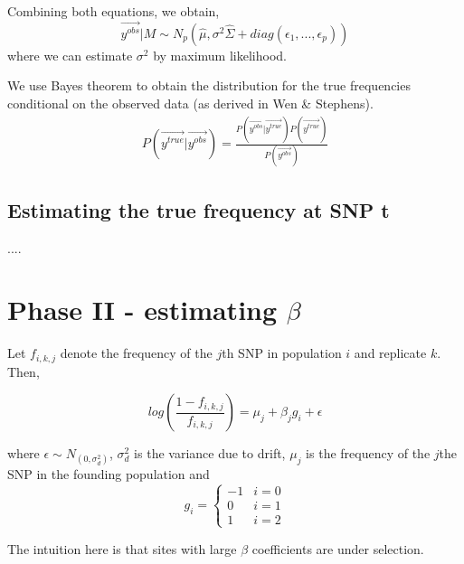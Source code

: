 \documentclass[10pt,a4paper,draft]{article}
\begin{document}
Combining both equations, we obtain,
\begin{equation}
 \vec{y^{obs}}|M \sim N_p(\hat{\mu}, \sigma^2\hat{\Sigma} + diag(\epsilon_1,...,\epsilon_p))
\end{equation}
where we can estimate $\sigma^2$ by maximum likelihood.

We use Bayes theorem to obtain the distribution for the true frequencies conditional on the observed data (as derived in Wen \& Stephens).
\begin{align*}
P(\vec{y^{true}} | \vec{y^{obs}}) = \frac{P(\vec{y^{obs}} | \vec{y^{true}}) P(\vec{y^{true}})}{P(\vec{y^{obs}})} 
\end{align*}

\iffalse
\begin{equation}
\sim N_p\Big((\frac{\hat{\Sigma}^{-1}}{\sigma^2} + \frac{I}{\epsilon^2})^{-1}(\frac{\hat{\Sigma}^{-1}\hat{\mu}}{\sigma^2} + \frac{\vec{y^{obs}}}{\epsilon^2}), (\frac{\hat{\Sigma}^{-1}}{\sigma^2} + \frac{I}{\epsilon^2})^{-1}\Big)\label{likl}
\end{equation}
\fi
\subsection{Estimating the true frequency at SNP t}
....

\section{Phase II - estimating $\beta$}
Let $f_{i,k,j}$ denote the frequency of the $j$th SNP in population $i$ and replicate $k$. Then,

\begin{equation}
log(\frac{1-f_{i,k,j}}{f_{i,k,j}}) = \mu_j + \beta_{j} g_i + \epsilon
\end{equation}

where $\epsilon \sim N_(0, \sigma_d^2)$, $\sigma_d^2$ is the variance due to drift, $\mu_j$ is the frequency of the $j$the SNP in the founding population and 
\[
   g_{i} = \left\{
     \begin{array}{lr}
       -1 &  i =0\\
        0 &  i =1 \\
        1 &  i =2
     \end{array}
   \right.
\]

The intuition here is that sites with large $\beta$ coefficients are under selection.
\end{document}
